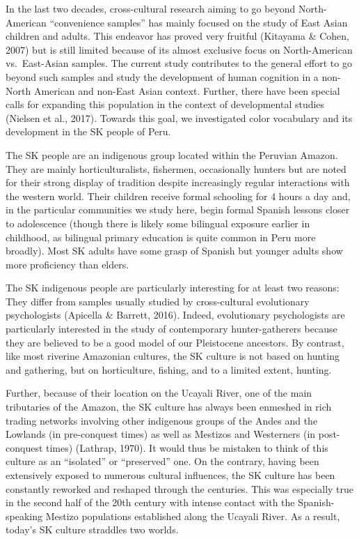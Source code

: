 \documentclass[
  english,
  ,man,floatsintext]{apa6}
\begin{document}
In the last two decades, cross-cultural research aiming to go beyond North-American \enquote{convenience samples} has mainly focused on the study of East Asian children and adults. This endeavor has proved very fruitful (Kitayama \& Cohen, 2007) but is still limited because of its almost exclusive focus on North-American vs.~East-Asian samples. The current study contributes to the general effort to go beyond such samples and study the development of human cognition in a non-North American and non-East Asian context. Further, there have been special calls for expanding this population in the context of developmental studies (Nielsen et al., 2017). Towards this goal, we investigated color vocabulary and its development in the SK people of Peru.

The SK people are an indigenous group located within the Peruvian Amazon. They are mainly horticulturalists, fishermen, occasionally hunters but are noted for their strong display of tradition despite increasingly regular interactions with the western world. Their children receive formal schooling for 4 hours a day and, in the particular communities we study here, begin formal Spanish lessons closer to adolescence (though there is likely some bilingual exposure earlier in childhood, as bilingual primary education is quite common in Peru more broadly). Most SK adults have some grasp of Spanish but younger adults show more proficiency than elders.

The SK indigenous people are particularly interesting for at least two reasons: They differ from samples usually studied by cross-cultural evolutionary psychologists (Apicella \& Barrett, 2016). Indeed, evolutionary psychologists are particularly interested in the study of contemporary hunter-gatherers because they are believed to be a good model of our Pleistocene ancestors. By contrast, like most riverine Amazonian cultures, the SK culture is not based on hunting and gathering, but on horticulture, fishing, and to a limited extent, hunting.

Further, because of their location on the Ucayali River, one of the main tributaries of the Amazon, the SK culture has always been enmeshed in rich trading networks involving other indigenous groups of the Andes and the Lowlands (in pre-conquest times) as well as Mestizos and Westerners (in post-conquest times) (Lathrap, 1970). It would thus be mistaken to think of this culture as an \enquote{isolated} or \enquote{preserved} one. On the contrary, having been extensively exposed to numerous cultural influences, the SK culture has been constantly reworked and reshaped through the centuries. This was especially true in the second half of the 20th century with intense contact with the Spanish-speaking Mestizo populations established along the Ucayali River. As a result, today's SK culture straddles two worlds.
\end{document}
